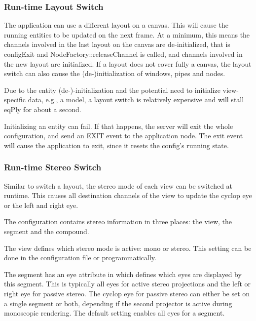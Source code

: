 \documentclass[10pt,a4]{scrartcl}
\begin{document}
\subsubsection{Run-time Layout Switch}

The application can use a different layout on a canvas. This will cause
the running entities to be updated on the next frame. At a minimum, this
means the channels involved in the last layout on the canvas are
de-initialized, that is \textsf{configExit} and
\textsf{NodeFactory::releaseChannel} is called, and channels involved in
the new layout are initialized. If a layout does not cover fully a
canvas, the layout switch can also cause the (de-)initialization of
windows, pipes and nodes.

Due to the entity (de-)-initialization and the potential need to
initialize view-specific data, e.g., a model, a layout switch is
relatively expensive and will stall \textsf{eqPly} for about a second.

Initializing an entity can fail. If that happens, the server will exit
the whole configuration, and send an \textsf{EXIT} event to the
application node. The exit event will cause the application to exit,
since it resets the config's running state.

\subsubsection{Run-time Stereo Switch}

Similar to switch a layout, the stereo mode of each view can be switched at
runtime. This causes all destination channels of the view to update the cyclop
eye or the left and right eye.

The configuration contains stereo information in three places: the view, the
segment and the compound.

The view defines which stereo mode is active: mono or stereo. This setting can
be done in the configuration file or programmatically.

The segment has an \textsf{eye} attribute in which defines which eyes are
displayed by this segment. This is typically all eyes for active stereo
projections and the left or right eye for passive stereo. The cyclop eye for
passive stereo can either be set on a single segment or both, depending if the
second projector is active during monoscopic rendering. The default setting
enables all eyes for a segment.
\end{document}

